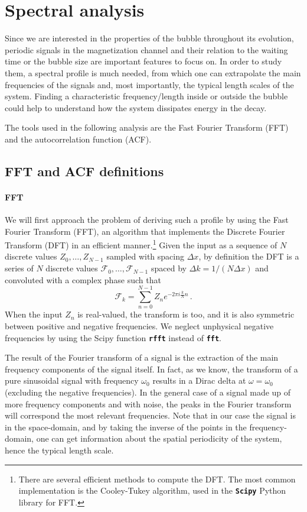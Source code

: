 \section{Spectral analysis}
Since we are interested in the properties of the bubble throughout its evolution, periodic signals in the magnetization channel and their relation to the waiting time or the bubble size are important features to focus on. In order to study them, a spectral profile is much needed, from which one can extrapolate the main frequencies of the signals and, most importantly, the typical length scales of the system.
Finding a characteristic frequency/length inside or outside the bubble could help to understand how the system dissipates energy in the decay.

The tools used in the following analysis are the Fast Fourier Transform (FFT) and the autocorrelation function (ACF).

\subsection{FFT and ACF definitions}
\paragraph{FFT}
We will first approach the problem of deriving such a profile by using the Fast Fourier Transform (FFT), an algorithm that implements the Discrete Fourier Transform (DFT) in an efficient manner.\footnote{There are several efficient methods to compute the DFT. The most common implementation is the Cooley-Tukey algorithm, used in the \texttt{\textbf{Scipy}} Python library for FFT.} Given the input as a sequence of $N$ discrete values $Z_0,\dots,Z_{N-1}$ sampled with spacing $\Delta x$, by definition the DFT is a series of $N$ discrete values $\mathcal{F}_0,\dots,\mathcal{F}_{N-1}$ spaced by $\Delta k = 1/(N\Delta x)$ and convoluted with a complex phase such that
\begin{equation*}
    \mathcal{F}_k = \sum_{n=0}^{N-1} Z_n e^{-2\pi i \frac{k}{N}n}\, .
\end{equation*}
When the input $Z_n$ is real-valued, the transform is too, and it is also symmetric between positive and negative frequencies. We neglect unphysical negative frequencies by using the Scipy function \texttt{\textbf{rfft}} instead of \texttt{\textbf{fft}}.

The result of the Fourier transform of a signal is the extraction of the main frequency components of the signal itself. In fact, as we know, the transform of a pure sinusoidal signal with frequency $\omega_0$ results in a Dirac delta at $\omega = \omega_0$ (excluding the negative frequencies). In the general case of a signal made up of more frequency components and with noise, the peaks in the Fourier transform will correspond the most relevant frequencies. Note that in our case the signal is in the space-domain, and by taking the inverse of the points in the frequency-domain, one can get information about the spatial periodicity of the system, hence the typical length scale.

